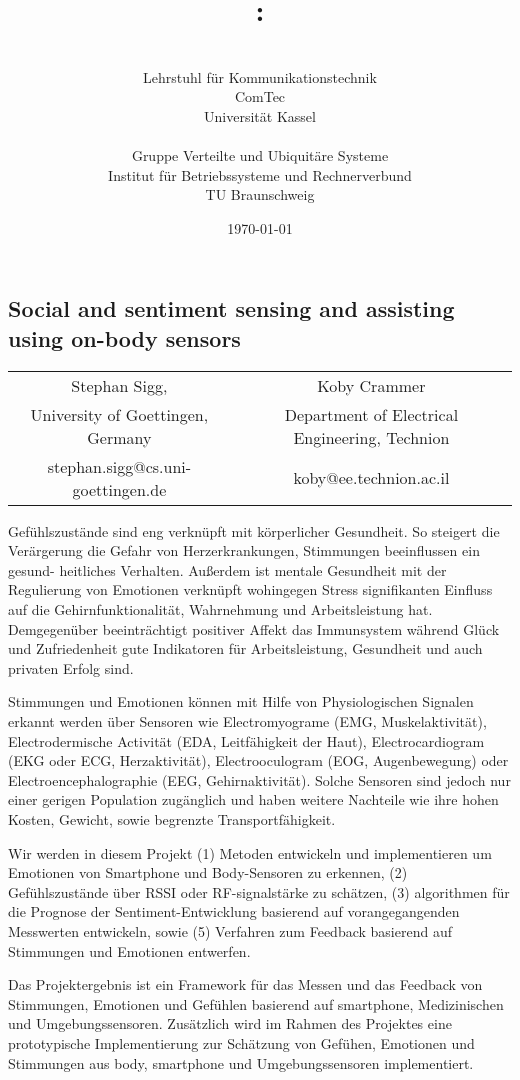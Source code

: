 \documentclass[12pt]{article}
\author{\begin{minipage}[t]{7.1cm}\centering \small \VornameAntragstellerA\ \NachnameAntragstellerA\\ \small Lehrstuhl für Kommunikationstechnik\\ \small ComTec\\ \small Universität Kassel\end{minipage}
\begin{minipage}[t]{7.1cm}\centering \small \VornameAntragstellerB\ \NachnameAntragstellerB\\ \small Gruppe Verteilte und Ubiquitäre Systeme \\ \small Institut für Betriebssysteme und Rechnerverbund\\ \small TU Braunschweig\end{minipage}}
\title{\projektname:\\\notiz{Social and sentiment sensing and assisting using on-body sensors}}
\date{\small \today}
\begin{document}
\onehalfspacing %
\setcounter{secnumdepth}{5}
\pagebreak
\begin{center}
\section*{Social and sentiment sensing and assisting using on-body sensors}
\begin{tabular}{cc}
  Stephan Sigg, & Koby Crammer\\
  University of Goettingen, Germany & Department of Electrical Engineering, Technion \\
 stephan.sigg@cs.uni-goettingen.de & koby@ee.technion.ac.il
\end{tabular}

\end{center}

Gefühlszustände sind eng verknüpft mit körperlicher Gesundheit. 
So steigert die Verärgerung die Gefahr von Herzerkrankungen, Stimmungen beeinflussen ein gesund- heitliches Verhalten.
Außerdem ist mentale Gesundheit mit der Regulierung von Emotionen verknüpft wohingegen Stress signifikanten Einfluss auf die Gehirnfunktionalität, Wahrnehmung und Arbeitsleistung hat.
Demgegenüber beeinträchtigt positiver Affekt das Immunsystem während Glück und Zufriedenheit gute Indikatoren für Arbeitsleistung, Gesundheit und auch privaten Erfolg sind. 

Stimmungen und Emotionen können mit Hilfe von Physiologischen Signalen erkannt werden über Sensoren wie Electromyograme (EMG, Muskelaktivität), Electrodermische Activität (EDA, Leitfähigkeit der Haut), Electrocardiogram (EKG oder ECG, Herzaktivität), Electrooculogram (EOG, Augenbewegung) oder Electroencephalographie (EEG, Gehirnaktivität).
Solche Sensoren sind jedoch nur einer gerigen Population zugänglich und haben weitere Nachteile wie ihre hohen Kosten, Gewicht, sowie begrenzte Transportfähigkeit.

Wir werden in diesem Projekt (1) Metoden entwickeln und implementieren um Emotionen von Smartphone und Body-Sensoren zu erkennen, (2) Gefühlszustände über RSSI oder RF-signalstärke zu schätzen, (3) algorithmen für die Prognose der Sentiment-Entwicklung basierend auf vorangegangenden Messwerten entwickeln, sowie (5) Verfahren zum Feedback basierend auf Stimmungen und Emotionen entwerfen. 

Das Projektergebnis ist ein Framework für das Messen und das Feedback von Stimmungen, Emotionen und Gefühlen basierend auf smartphone, Medizinischen und Umgebungssensoren. 
Zusätzlich wird im Rahmen des Projektes eine prototypische Implementierung zur Schätzung von Gefühen, Emotionen und Stimmungen aus body, smartphone und Umgebungssensoren implementiert.  

\label{maxSeitenzahl}
\end{document}
